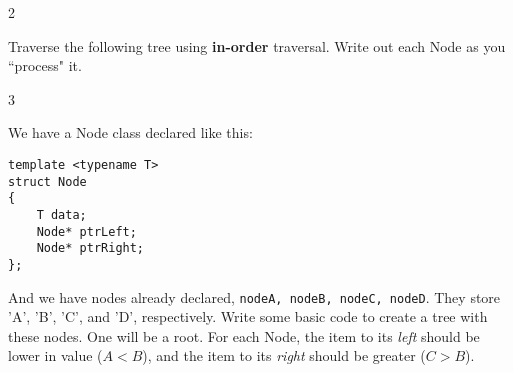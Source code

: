 \documentclass[a4paper,12pt,oneside]{book}
\newcounter{question}
\begin{document}
        \begin{question}{\thequestion}{2}

            Traverse the following tree using \textbf{in-order} traversal. Write
            out each Node as you ``process" it. ~\\
            
            
            
        \end{question}

        \newpage

        \begin{question}{\thequestion}{3}

            We have a Node class declared like this:
\footnotesize 
\begin{verbatim}
template <typename T>
struct Node
{
    T data;
    Node* ptrLeft;
    Node* ptrRight;
};
\end{verbatim}
\normalsize 

        And we have nodes already declared, \texttt{nodeA, nodeB, nodeC, nodeD}.
        They store 'A', 'B', 'C', and 'D', respectively. Write some basic
        code to create a tree with these nodes. One will be a root. For each Node,
        the item to its \textit{left} should be lower in value ($A < B$), and
        the item to its \textit{right} should be greater ($C > B$).

            
        \end{question}

        
\end{document}
